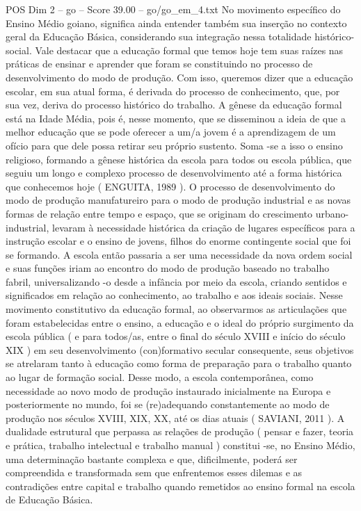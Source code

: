 \begin{textsample}{POS Dim 2 – go – Score 39.00 – go/go\_em\_4.txt}
No movimento específico do Ensino Médio goiano, significa ainda entender também sua inserção no contexto geral da Educação Básica, considerando sua integração nessa totalidade histórico-social.
Vale destacar que a educação formal que temos hoje tem suas raízes nas práticas de ensinar e aprender que foram se constituindo no processo de desenvolvimento do modo de produção.
Com isso, queremos dizer que a educação escolar, em sua atual forma, é derivada do processo de conhecimento, que, por sua vez, deriva do processo histórico do trabalho.
A gênese da educação formal está na Idade Média, pois é, nesse momento, que se disseminou a ideia de que a melhor educação que se pode oferecer a um/a jovem é a aprendizagem de um ofício para que dele possa retirar seu próprio sustento.
Soma -se a isso o ensino religioso, formando a gênese histórica da escola para todos ou escola pública, que seguiu um longo e complexo processo de desenvolvimento até a forma histórica que conhecemos hoje ( ENGUITA, 1989 ).
O processo de desenvolvimento do modo de produção manufatureiro para o modo de produção industrial e as novas formas de relação entre tempo e espaço, que se originam do crescimento urbano-industrial, levaram à necessidade histórica da criação de lugares específicos para a instrução escolar e o ensino de jovens, filhos do enorme contingente social que foi se formando.
A escola então passaria a ser uma necessidade da nova ordem social e suas funções iriam ao encontro do modo de produção baseado no trabalho fabril, universalizando -o desde a infância por meio da escola, criando sentidos e significados em relação ao conhecimento, ao trabalho e aos ideais sociais.
Nesse movimento constitutivo da educação formal, ao observarmos as articulações que foram estabelecidas entre o ensino, a educação e o ideal do próprio surgimento da escola pública ( e para todos/as, entre o final do século XVIII e início do século XIX ) em seu desenvolvimento (con)formativo secular consequente, seus objetivos se atrelaram tanto à educação como forma de preparação para o trabalho quanto ao lugar de formação social.
Desse modo, a escola contemporânea, como necessidade ao novo modo de produção instaurado inicialmente na Europa e posteriormente no mundo, foi se (re)adequando constantemente ao modo de produção nos séculos XVIII, XIX, XX, até os dias atuais ( SAVIANI, 2011 ).
A dualidade estrutural que perpassa as relações de produção ( pensar e fazer, teoria e prática, trabalho intelectual e trabalho manual ) constitui -se, no Ensino Médio, uma determinação bastante complexa e que, dificilmente, poderá ser compreendida e transformada sem que enfrentemos esses dilemas e as contradições entre capital e trabalho quando remetidos ao ensino formal na escola de Educação Básica.

\end{textsample}
